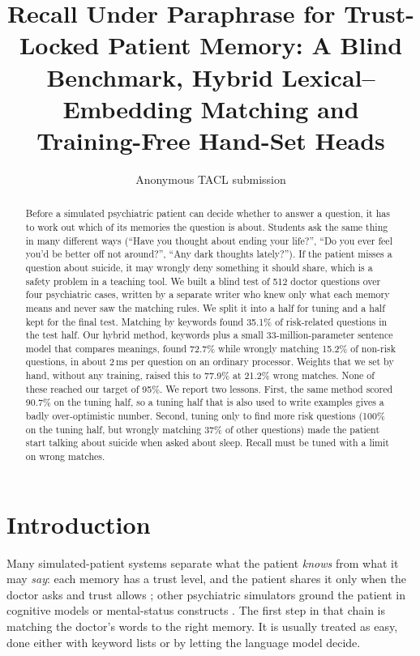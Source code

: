 \documentclass[11pt,a4paper]{article}
\title{Recall Under Paraphrase for Trust-Locked Patient Memory: A Blind Benchmark, Hybrid Lexical--Embedding Matching and Training-Free Hand-Set Heads}
\author{Anonymous TACL submission}
\date{}
\begin{document}
\maketitle
\begin{abstract}
Before a simulated psychiatric patient can decide whether to answer a question, it has to work out which of its memories the question is
about. Students ask the same thing in many different ways (``Have you thought about ending your life?'', ``Do you ever feel you'd be better off
not around?'', ``Any dark thoughts lately?''). If the patient misses a question about suicide, it may wrongly deny something it should share, which
is a safety problem in a teaching tool. We built a blind test of 512 doctor questions over four psychiatric cases, written by a separate writer
who knew only what each memory means and never saw the matching rules. We split it into a half for tuning and a half kept for the final test.
Matching by keywords found 35.1\% of risk-related questions in the test half. Our hybrid method, keywords plus a small 33-million-parameter
sentence model that compares meanings, found 72.7\% while wrongly matching 15.2\% of non-risk questions, in about 2\,ms per question on an
ordinary processor. Weights that we set by hand, without any training, raised this to 77.9\% at 21.2\% wrong matches. None of these reached our
target of 95\%. We report two lessons. First, the same method scored 90.7\% on the tuning half, so a tuning half that is also used to write
examples gives a badly over-optimistic number. Second, tuning only to find more risk questions (100\% on the tuning half, but wrongly matching
37\% of other questions) made the patient start talking about suicide when asked about sleep. Recall must be tuned with a limit on wrong
matches.
\end{abstract}

\section{Introduction}
Many simulated-patient systems separate what the patient \emph{knows} from what it may \emph{say}: each memory has a trust level, and the patient
shares it only when the doctor asks and trust allows \citep{sabour2026patientact}; other psychiatric simulators ground the patient in
cognitive models or mental-status constructs \citep{wang2024patient,lee2025psyche}. The first step in that chain is
matching the doctor's words to the right memory. It is usually treated as easy, done either with keyword lists or by letting the language
model decide.
\end{document}
